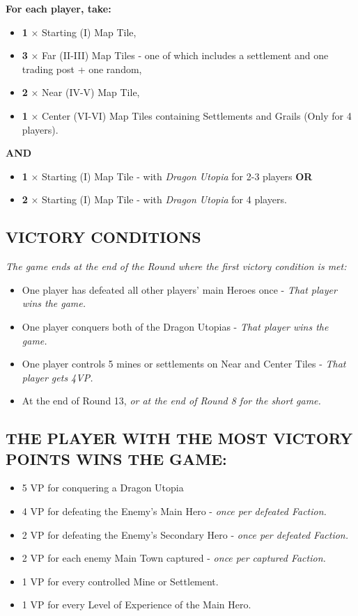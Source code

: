 \begin{multicols*}{2}
\textbf{For each player, take:}
\begin{itemize}
  \item \textbf{1} × Starting (I) Map Tile,
  \item \textbf{3} × Far (II-III) Map Tiles - one of which includes a settlement and one trading post + one random,
  \item \textbf{2} × Near (IV-V) Map Tile,
  \item \textbf{1} × Center (VI-VI) Map Tiles containing Settlements and Grails (Only for 4 players).
\end{itemize}
\textbf{AND}

\begin{itemize}
  \item \textbf{1} × Starting (I) Map Tile - with \textit{Dragon Utopia} for 2-3 players \textbf{OR}
  \item \textbf{2} × Starting (I) Map Tile - with \textit{Dragon Utopia} for 4 players.
\end{itemize}

\subsection*{\MakeUppercase{Victory Conditions}}
\textit{The game ends at the end of the Round where the first victory condition is met:}
\begin{itemize}
  \item One player has defeated all other players’ main Heroes once - \textit{That player wins the game.}
  \item One player conquers both of the Dragon Utopias - \textit{That player wins the game.}
  \item One player controls 5 mines or settlements on Near and Center Tiles - \textit{That player gets 4VP.}
  \item At the end of Round 13, \textit{or at the end of Round 8 for the short game.}
\end{itemize}

\subsection*{\MakeUppercase{The player with the most Victory Points wins the game:}}
\begin{itemize}
  \item 5 VP for conquering a Dragon Utopia
  \item 4 VP for defeating the Enemy’s Main Hero - \textit{once per defeated Faction.}
  \item 2 VP for defeating the Enemy’s Secondary Hero - \textit{once per defeated Faction.}
  \item 2 VP for each enemy Main Town captured - \textit{once per captured Faction.}
  \item 1 VP for every controlled Mine or Settlement.
  \item 1 VP for every Level of Experience of the Main Hero.
\end{itemize}


\end{multicols*}

